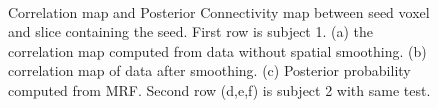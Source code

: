 \documentclass[runningheads,a4paper]{llncs}
\begin{document}
\begin{figure}[bth]
  \centering 
  \\

  \caption[]{Correlation map and Posterior Connectivity map between
    seed voxel and slice containing the seed. First row is subject
    1. (a) the correlation map computed from data without spatial
    smoothing. (b) correlation map of data after smoothing. (c)
    Posterior probability computed from MRF. Second row (d,e,f) is
    subject 2 with same test.}
  \label{fig:3}
\end{figure}
 
\end{document}
